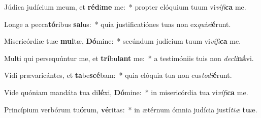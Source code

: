 \item Júdica judícium meum, et \textbf{réd}i\textbf{me} me:~* propter elóquium tuum vi\textit{ví}\textit{fi}\textbf{ca} me.
\item Longe a pecca\textbf{tó}ribus \textbf{sa}lus:~* quia justificatiónes tuas non ex\textit{qui}\textit{si}\textbf{é}runt.
\item Misericórdiæ tuæ \textbf{mul}tæ, \textbf{Dó}mine:~* secúndum judícium tuum vi\textit{ví}\textit{fi}\textbf{ca} me.
\item Multi qui persequúntur me, et \textbf{trí}bu\textbf{lant} me:~* a testimóniis tuis non \textit{de}\textit{cli}\textbf{ná}vi.
\item Vidi prævaricántes, et \textbf{ta}be\textbf{scé}bam:~* quia elóquia tua non cus\textit{to}\textit{di}\textbf{é}runt.
\item Vide quóniam mandáta tua di\textbf{lé}xi, \textbf{Dó}mine:~* in misericórdia tua vi\textit{ví}\textit{fi}\textbf{ca} me.
\item Princípium verbórum tu\textbf{ó}rum, \textbf{vé}ritas:~* in ætérnum ómnia judícia justí\textit{ti}\textit{æ} \textbf{tu}æ.
